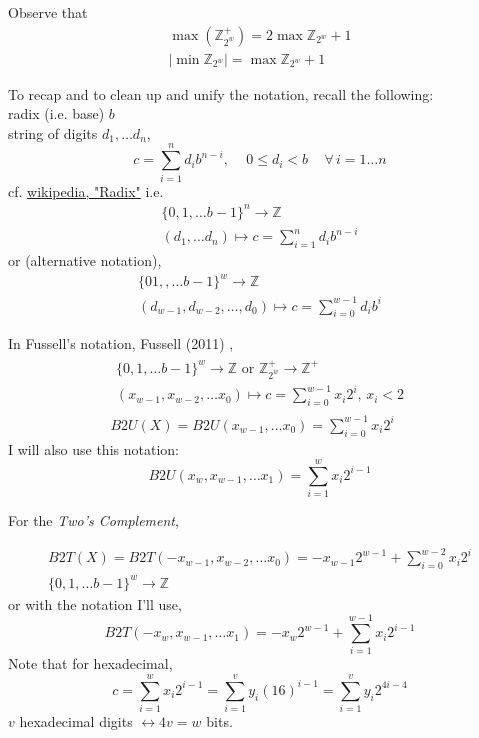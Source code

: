 \documentclass[10pt]{amsart}
\begin{document}
\begin{multicols*}{2}
Observe that 
\begin{equation}
\begin{gathered}
\max{ \left( \mathbb{Z}^+_{2^w} \right) } = 2 \max{ \mathbb{Z}_{2^w} } + 1 \\
| \min{ \mathbb{Z}_{2^w} } | = \max{ \mathbb{Z}_{2^w} } + 1
\end{gathered}
\end{equation}

To recap and to clean up and unify the notation, recall the following: \\
radix (i.e. base) $b$ \\
string of digits $d_1, \dots d_n$, 
\[
c = \sum_{i=1}^n d_i b^{n-i} , \quad \, 0 \leq d_i < b \quad \, \forall \, i = 1 \dots n
\]
cf. \href{https://en.wikipedia.org/wiki/Radix}{wikipedia, "Radix"}
i.e.
\[
\begin{gathered}
\lbrace 0 ,1 ,\dots b-1 \rbrace^n \to \mathbb{Z} \\ 
(d_1, \dots d_n) \mapsto c = \sum_{i=1}^n d_i b^{n-i}
\end{gathered}
\]
or (alternative notation),
\[
\begin{gathered}
\lbrace 0 1, ,\dots b-1 \rbrace^w \to \mathbb{Z} \\ 
(d_{w-1}, d_{w-2}, \dots, d_0) \mapsto c = \sum_{i=0}^{w-1} d_i b^i 
\end{gathered}
\]

In Fussell's notation, Fussell (2011) \cite{Fuss2011},
\[
\begin{gathered}
\begin{gathered}
\lbrace 0 ,1, \dots b-1 \rbrace^w \to \mathbb{Z} \text{ or } \mathbb{Z}^+_{2^w} \to \mathbb{Z}^+ \\
(x_{w-1}, x_{w-2}, \dots x_0) \mapsto c = \sum_{i=0}^{w-1} x_i 2^i, \, x_i < 2
\end{gathered} \\
B2U(X) = B2U(x_{w-1}, \dots x_0) = \sum_{i=0}^{w-1} x_i 2^i
\end{gathered}
\]
I will also use this notation:
\[
B2U(x_w, x_{w-1}, \dots x_1) = \sum_{i=1}^w x_i 2^{i-1}
\]

For the \emph{Two's Complement},

\[
\begin{gathered}
	B2T(X) = B2T(-x_{w-1}, x_{w-2}, \dots x_0) = -x_{w-1}2^{w-1} + \sum_{i=0}^{w-2} x_i 2^i \\
	\lbrace 0 , 1, \dots b-1 \rbrace^w \to \mathbb{Z} 
\end{gathered}
\]
or with the notation I'll use,
\[
B2T(-x_w, x_{w-1}, \dots x_1) = -x_w 2^{w-1} + \sum_{i=1}^{w-1} x_i 2^{i-1}
\]
Note that for hexadecimal,
\[
c = \sum_{i=1}^w x_i 2^{i-1} = \sum_{i=1}^v y_i (16)^{i-1} = \sum_{i=1}^v y_i 2^{4i-4}
\]
$v$ hexadecimal digits $\leftrightarrow  4v = w$ bits.


\end{multicols*}
\end{document}
